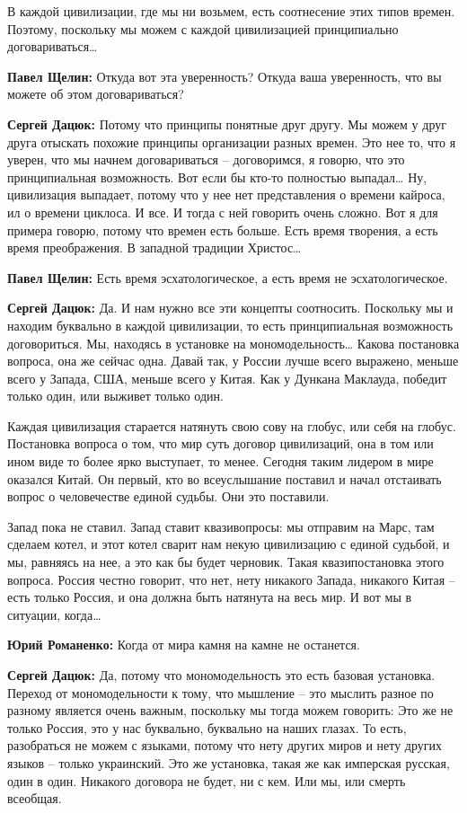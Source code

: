 В каждой цивилизации, где мы ни возьмем, есть соотнесение этих типов времен.
Поэтому, поскольку мы можем с каждой цивилизацией принципиально договариваться…

\textbf{Павел Щелин:} Откуда вот эта уверенность? Откуда ваша уверенность, что вы можете
об этом договариваться?

\textbf{Сергей Дацюк:} Потому что принципы понятные друг другу. Мы можем у друг друга
отыскать похожие принципы организации разных времен. Это нее то, что я уверен,
что мы начнем договариваться – договоримся, я говорю, что это принципиальная
возможность. Вот если бы кто-то полностью выпадал… Ну, цивилизация выпадает,
потому что у нее нет представления о времени кайроса, ил о времени циклоса. И
все. И тогда с ней говорить очень сложно. Вот я для примера говорю, потому что
времен есть больше. Есть время творения, а есть время преображения. В западной
традиции Христос…

\textbf{Павел Щелин:} Есть время эсхатологическое, а есть время не эсхатологическое.

\textbf{Сергей Дацюк:} Да. И нам нужно все эти концепты соотносить. Поскольку мы и
находим буквально в каждой цивилизации, то есть принципиальная возможность
договориться. Мы, находясь в установке на мономодельность… Какова постановка
вопроса, она же сейчас одна. Давай так, у России лучше всего выражено, меньше
всего у Запада, США, меньше всего у Китая. Как у Дункана Маклауда, победит
только один, или выживет только один.

Каждая цивилизация старается натянуть свою сову на глобус, или себя на глобус.
Постановка вопроса о том, что мир суть договор цивилизаций, она в том или ином
виде то более ярко выступает, то менее. Сегодня таким лидером в мире оказался
Китай. Он первый, кто во всеуслышание поставил и начал отстаивать вопрос о
человечестве единой судьбы. Они это поставили.

Запад пока не ставил. Запад ставит квазивопросы: мы отправим на Марс, там
сделаем котел, и этот котел сварит нам некую цивилизацию с единой судьбой, и
мы, равняясь на нее, а это как бы будет черновик. Такая квазипостановка этого
вопроса. Россия честно говорит, что нет, нету никакого Запада, никакого Китая –
есть только Россия, и она должна быть натянута на весь мир. И вот мы в
ситуации, когда…

\textbf{Юрий Романенко:} Когда от мира камня на камне не останется.

\textbf{Сергей Дацюк:} Да, потому что мономодельность это есть базовая установка.
Переход от мономодельности к тому, что мышление – это мыслить разное по разному
является очень важным, поскольку мы тогда можем говорить: Это же не только
Россия, это у нас буквально, буквально на наших глазах. То есть, разобраться не
можем с языками, потому что нету других миров и нету других языков – только
украинский. Это же установка, такая же как имперская русская, один в один.
Никакого договора не будет, ни с кем. Или мы, или смерть всеобщая.

